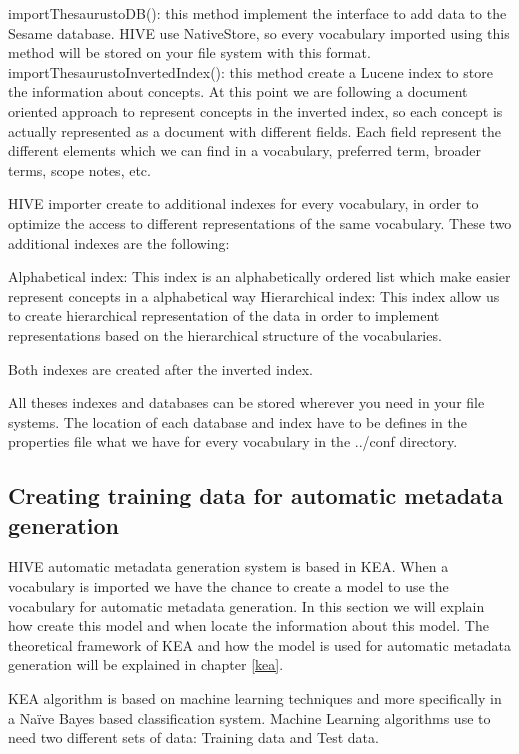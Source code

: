 importThesaurustoDB(): this method implement the interface to add data to the Sesame database. HIVE use NativeStore, so every vocabulary imported using this 
method will be stored on your file system with this format.
importThesaurustoInvertedIndex(): this method create a Lucene index to store the information about concepts. At this point we are following a document 
oriented approach to represent concepts in the inverted index, so each concept is actually represented as a document with different fields. Each field 
represent the different elements which we can find in a vocabulary, preferred term, broader terms, scope notes, etc.

HIVE importer create to additional indexes for every vocabulary, in order to optimize the access to different representations of the same vocabulary. These 
two additional indexes are the following:

Alphabetical index: This index is an alphabetically ordered list which make easier represent concepts in a alphabetical way
Hierarchical index: This index allow us to create hierarchical representation of the data in order to implement representations based on the hierarchical 
structure of the vocabularies.

Both indexes are created after the inverted index. 

All theses indexes and databases can be stored wherever you need in your file systems. The location of each database and index have to be defines in the properties 
file what we have for every vocabulary in the ../conf directory.

\subsection{Creating training data for automatic metadata generation}

HIVE automatic metadata generation system is based in KEA. When a vocabulary is imported we have the chance to create a model to use the vocabulary for automatic 
metadata generation. In this section we will explain how create this model and when locate the information about this model. The theoretical framework of KEA and 
how the model is used for automatic metadata generation will be explained in chapter \ref{kea}.

KEA algorithm is based on machine learning techniques and more specifically in a Naïve Bayes based classification system. Machine Learning algorithms use to need 
two different sets of data: Training data and Test data.

